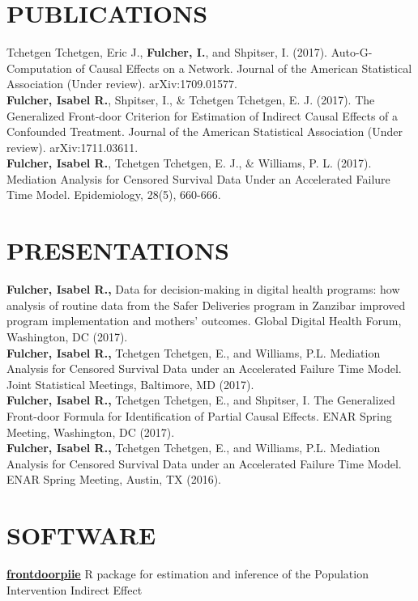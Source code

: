 \documentclass[12pt]{article}
\begin{document}
\section*{\textbf{{\Large P{\small UBLICATIONS}}}}

Tchetgen Tchetgen, Eric J., \textbf{Fulcher, I.}, and Shpitser, I. (2017). Auto-G-Computation of Causal Effects on a Network. Journal of the American Statistical Association (Under review). arXiv:1709.01577. \\

\textbf{Fulcher, Isabel R.}, Shpitser, I., \& Tchetgen Tchetgen, E. J. (2017). The Generalized Front-door Criterion for Estimation of Indirect Causal Effects of a Confounded Treatment. Journal of the American Statistical Association (Under review). arXiv:1711.03611. \\

\textbf{Fulcher, Isabel R.}, Tchetgen Tchetgen, E. J., \& Williams, P. L. (2017). Mediation Analysis for Censored Survival Data Under an Accelerated Failure Time Model. Epidemiology, 28(5), 660-666. 

\section*{\textbf{{\Large P}{\small RESENTATIONS}}}

\textbf{Fulcher, Isabel R.,} Data for decision-making in digital health programs: how analysis of routine data from the Safer Deliveries program in Zanzibar improved program implementation and mothers' outcomes. Global Digital Health Forum, Washington, DC (2017). \\

\textbf{Fulcher, Isabel R.,} Tchetgen Tchetgen, E., and Williams, P.L. Mediation Analysis for Censored Survival Data under an Accelerated Failure Time Model. Joint Statistical Meetings, Baltimore, MD (2017). \\

\textbf{Fulcher, Isabel R.,} Tchetgen Tchetgen, E., and Shpitser, I. The Generalized Front-door Formula for Identification of Partial Causal Effects. ENAR Spring Meeting, Washington, DC (2017). \\

\textbf{Fulcher, Isabel R.,} Tchetgen Tchetgen, E., and Williams, P.L. Mediation Analysis for Censored Survival Data under an Accelerated Failure Time Model. ENAR Spring Meeting, Austin, TX (2016). 


\section*{\textbf{{\Large S}{\small OFTWARE} }}

{\bf \href{https://isabelfulcher.github.io/frontdoorpiie/}{frontdoorpiie}} R package for estimation and inference of the Population Intervention Indirect Effect \\

\end{document}
